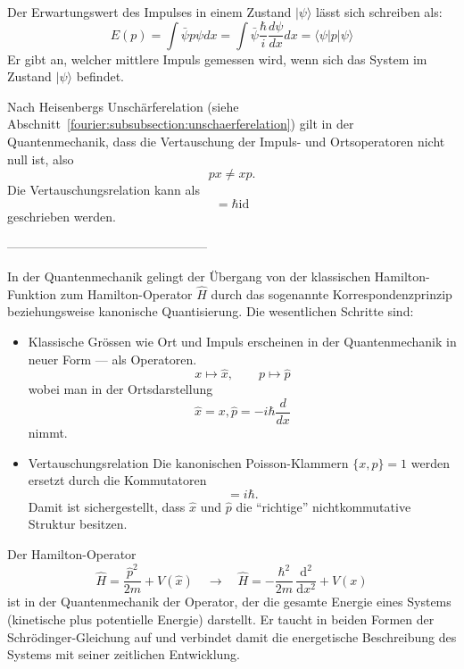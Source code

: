 	Der Erwartungswert des Impulses in einem Zustand $|\psi\rangle$ lässt sich schreiben als:
	\begin{equation}
		E(p) = \int \bar{\psi}p\psi dx
		= \int \bar{\psi} \frac{\hbar}{i} \frac{d\psi}{dx} dx
		= \langle \psi | p | \psi \rangle
	\end{equation}
	Er gibt an, welcher mittlere Impuls gemessen wird, wenn sich das System im Zustand $|\psi\rangle$ befindet.

	Nach Heisenbergs Unschärferelation (siehe Abschnitt~\ref{fourier:subsubsection:unschaerferelation}) gilt in der Quantenmechanik, dass die Vertauschung der Impuls- und Ortsoperatoren nicht null ist, also
	\begin{equation}
		px \neq xp.
	\end{equation}
	Die Vertauschungsrelation kann als
	\begin{equation}
		[x, p] = \hbar \text{id}
	\end{equation}
	geschrieben werden.



------------------------------------------------ %

In der Quantenmechanik gelingt der Übergang von der klassischen Hamilton-Funktion zum Hamilton-Operator $\hat H$ durch das sogenannte Korrespondenzprinzip beziehungsweise kanonische Quantisierung.
Die wesentlichen Schritte sind:
\begin{itemize}
\item Klassische Grössen wie Ort und Impuls erscheinen in der Quantenmechanik in neuer Form --- als Operatoren.
\begin{equation}
	x \longmapsto \hat{x}, \qquad p \longmapsto \hat{p}
\end{equation}
wobei man in der Ortsdarstellung
\begin{equation}
	\hat{x} = x, \hat{p} = -i \hbar \frac{d}{dx}
\end{equation}
nimmt.
\item Vertauschungsrelation
Die kanonischen Poisson-Klammern $\{x, p\} = 1$ werden ersetzt durch die Kommutatoren
\begin{equation}
	[\hat{x}, \hat{p}] = i \hbar.
\end{equation}
Damit ist sichergestellt, dass $\hat{x}$ und $\hat{p}$ die ``richtige'' nichtkommutative Struktur besitzen.

\end{itemize}
Der Hamilton-Operator
\begin{equation}\label{fourier:equation:hamiltonOperator}
 	\hat{H} = \frac{\hat p^2}{2m} + V(\hat{x})
    \quad\longrightarrow\quad
    \hat{H} = -\frac{\hbar^2}{2m}\,\frac{\mathrm{d}^2}{\mathrm{d}x^2} + V(x)
\end{equation}
ist in der Quantenmechanik der Operator, der die gesamte Energie eines Systems (kinetische plus potentielle Energie) darstellt.
Er taucht in beiden Formen der Schrödinger-Gleichung auf und verbindet damit die energetische Beschreibung des Systems mit seiner zeitlichen Entwicklung.

